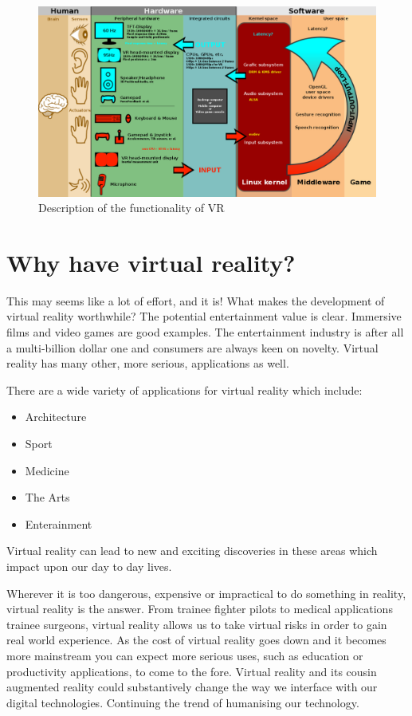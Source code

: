 \begin{figure}[!h]
	\begin{center}
		\includegraphics[width=0.7\linewidth]{images/vr_desc}
		\caption{Description of the functionality of VR}
	\end{center}
\end{figure}

\newpage
\section{Why have virtual reality?}

This may seems like a lot of effort, and it is! What makes the development of virtual reality worthwhile? The potential entertainment value is clear. Immersive films and video games are good examples. The entertainment industry is after all a multi-billion dollar one and consumers are always keen on novelty. Virtual reality has many other, more serious, applications as well.

There are a wide variety of applications for virtual reality which include:

\begin{itemize}
	\item Architecture
	\item Sport
	\item Medicine
	\item The Arts
	\item Enterainment
\end{itemize}

Virtual reality can lead to new and exciting discoveries in these areas which impact upon our day to day lives.

Wherever it is too dangerous, expensive or impractical to do something in reality, virtual reality is the answer. From trainee fighter pilots to medical applications trainee surgeons, virtual reality allows us to take virtual risks in order to gain real world experience. As the cost of virtual reality goes down and it becomes more mainstream you can expect more serious uses, such as education or productivity applications, to come to the fore. Virtual reality and its cousin augmented reality could substantively change the way we interface with our digital technologies. Continuing the trend of humanising our technology.


